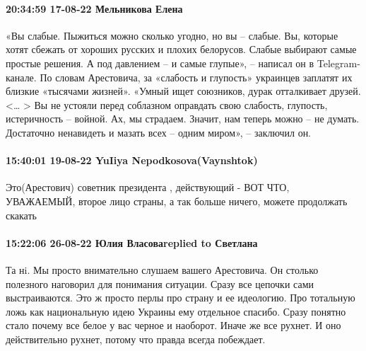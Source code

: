  
 
 
 
 

\paragraph{20:34:59 17-08-22 Мельникова Елена}


«Вы слабые. Пыжиться можно сколько угодно, но вы – слабые. Вы, которые хотят сбежать от хороших русских и плохих белорусов. Слабые выбирают самые простые решения. А под давлением – и самые глупые», – написал он в Telegram-канале.
По словам Арестовича, за «слабость и глупость» украинцев заплатят их близкие «тысячами жизней».
«Умный ищет союзников, дурак отталкивает друзей. <… > Вы не устояли перед соблазном оправдать свою слабость, глупость, истеричность – войной. Ах, мы страдаем. Значит, нам теперь можно – не думать. Достаточно ненавидеть и мазать всех – одним миром», – заключил он.

\paragraph{15:40:01 19-08-22 YuIiya Nepodkosova(Vaynshtok)}

Это(Арестович) советник президента , действующий - ВОТ ЧТО, УВАЖАЕМЫЙ, второе
лицо страны, а так больше ничего, можете продолжать скакать


\paragraph{15:22:06 26-08-22 Юлия Власоваreplied to Светлана}

Та нi. Мы просто внимательно слушаем вашего Арестовича. Он столько полезного наговорил для понимания ситуации. Сразу все цепочки сами выстраиваются. 
Это ж просто перлы про страну и ее идеологию.
Про тотальную ложь как национальную идею Украины ему отдельное спасибо.  Сразу понятно стало почему все белое у вас черное и наоборот. Иначе же все рухнет. И оно действительно рухнет, потому что правда всегда побеждает.
